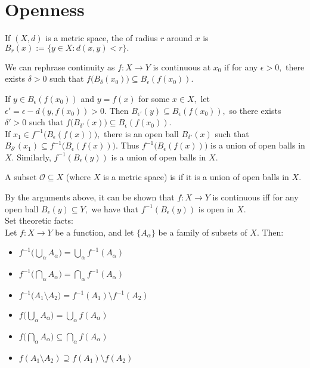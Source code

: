 \section{Openness}

\begin{defn}
If $(X,d)$ is a metric space, the  of radius $r$ around $x$ is \\ $B_r(x):=\{y\in X: d(x,y)<r\}.$
\end{defn}

\begin{defn}
We can rephrase continuity as $f:X\rightarrow Y$ is continuous at $x_0$ if for any $\epsilon>0,$ there exists $\delta>0$ such that $f\Big(B_{\delta}(x_0)\Big)\subseteq B_{\epsilon}(f(x_0)).$
\end{defn}

\noindent
If $y\in B_{\epsilon}(f(x_0))$ and $y=f(x)$ for some $x\in X,$ let $\epsilon'=\epsilon-d(y,f(x_0))>0.$ Then $B_{\epsilon'}(y)\subseteq B_{\epsilon}(f(x_0)),$ so there exists $\delta'>0$ such that $f\Big(B_{\delta'}(x)\Big)\subseteq B_{\epsilon}(f(x_0)).$ \\
If $x_1\in f^{-1}\Big(B_{\epsilon}(f(x))\Big),$ there is an open ball $B_{\delta'}(x)$ such that $B_{\delta'}(x_1)\subseteq f^{-1}\Big(B_{\epsilon}(f(x))\Big).$ Thus $f^{-1}\Big(B_{\epsilon}(f(x))\Big)$ is a union of open balls in $X.$ Similarly, $f^{-1}(B_{\epsilon}(y))$ is a union of open balls in $X.$

\begin{defn}
A subset $\mathcal{O}\subseteq X$ (where $X$ is a metric space) is  if it is a union of open balls in $X.$
\end{defn}

By the arguments above, it can be shown that $f:X\rightarrow Y$ is continuous iff for any open ball $B_{\epsilon}(y)\subseteq Y,$ we have that $f^{-1}(B_{\epsilon}(y))$ is open in $X.$ \\

\noindent Set theoretic facts:\\
Let $f:X\rightarrow Y$ be a function, and let $\{A_{\alpha}\}$ be a family of subsets of $X.$ Then:
\begin{itemize}
\item $f^{-1}\Big(\bigcup_{\alpha} A_{\alpha}\Big) = \bigcup_{\alpha} f^{-1}(A_{\alpha})$
\item $f^{-1}\Big(\bigcap_{\alpha} A_{\alpha}\Big) = \bigcap_{\alpha} f^{-1}(A_{\alpha})$
\item $f^{-1}\Big(A_1\setminus A_2) = f^{-1}(A_1)\setminus f^{-1}(A_2)$
\item $f\Big(\bigcup_{\alpha} A_{\alpha}\Big) = \bigcup_{\alpha} f(A_{\alpha})$
\item $f\Big(\bigcap_{\alpha} A_{\alpha}\Big) \subseteq \bigcap_{\alpha} f(A_{\alpha})$
\item $f(A_1\setminus A_2)\supseteq f(A_1)\setminus f(A_2)$
\end{itemize}

